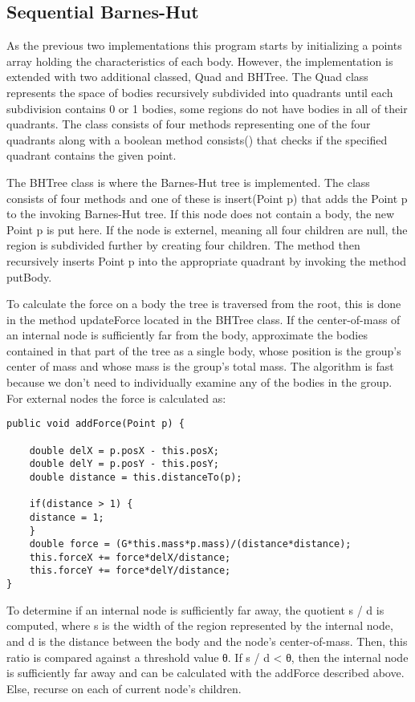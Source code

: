 \documentclass{article}
\begin{document}
\subsection{Sequential Barnes-Hut}

As the previous two implementations this program starts by initializing a points array holding the characteristics of each body. However, the implementation is extended with two additional classed, Quad and BHTree. The Quad class represents the space of bodies recursively subdivided into quadrants until each subdivision contains 0 or 1 bodies, some regions do not have bodies in all of their quadrants. The class consists of four methods representing one of the four quadrants along with a boolean method consists() that checks if the specified quadrant contains the given point.  

The BHTree class is where the Barnes-Hut tree is implemented. The class consists of four methods and one of these is insert(Point p) that adds the Point p to the invoking Barnes-Hut tree. If this node does not contain a body, the new Point p is put here. If the node is externel, meaning all four children are null, the region is subdivided further by creating four children. The method then recursively inserts Point p into the appropriate quadrant by invoking the method putBody.

To calculate the force on a body the tree is traversed from the root, this is done in the method updateForce located in the BHTree class. If the center-of-mass of an internal node is sufficiently far from the body, approximate the bodies contained in that part of the tree as a single body, whose position is the group’s center of mass and whose mass is the group’s total mass. The algorithm is fast because we don’t need to individually examine any of the bodies in the group. For external nodes the force is calculated as: 
\begin{verbatim} 
public void addForce(Point p) {         

    double delX = p.posX - this.posX;         
    double delY = p.posY - this.posY;         
    double distance = this.distanceTo(p);                  

    if(distance > 1) {            
    distance = 1;         
    }          
    double force = (G*this.mass*p.mass)/(distance*distance);         
    this.forceX += force*delX/distance;         
    this.forceY += force*delY/distance;     
}
\end{verbatim}
To determine if an internal node is sufficiently far away, the quotient s / d is computed, where s is the width of the region represented by the internal node, and d is the distance between the body and the node’s center-of-mass. Then, this ratio is compared against a threshold value θ. If s / d < θ, then the internal node is sufficiently far away and can be calculated with the addForce described above. Else, recurse on each of current node's children. 
\end{document}

